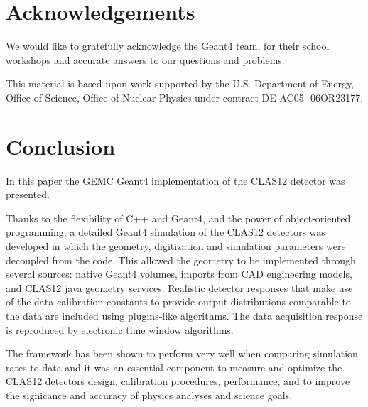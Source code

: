\section{Acknowledgements}

We would like to gratefully acknowledge the Geant4 team,
for their school workshops and accurate answers to our questions and problems.

This material is based upon work supported by the U.S. Department of Energy,
Office of Science, Office of Nuclear Physics under contract DE-AC05- 06OR23177.

\section{Conclusion}
In this paper the GEMC Geant4 implementation of the CLAS12 detector was presented.

Thanks to the flexibility of C++ and Geant4, and the power of object-oriented programming,
a detailed Geant4 simulation of the CLAS12 detectors was developed in which the geometry,
digitization and simulation parameters were decoupled from the code.
This allowed the geometry to be implemented through several sources: native Geant4 volumes, imports from CAD engineering models,
and CLAS12 java geometry services. Realistic detector responses that
make use of the data calibration constants to provide output distributions comparable to the data are included
using plugins-like algorithms. The data acquisition response is reproduced by electronic time window algorithms.

The framework has been shown to perform very well when comparing simulation rates to data
and it was an essential component to measure and optimize the CLAS12 detectors design, calibration procedures, performance,
and to improve the signicance and accuracy of physics analyses and science goals.
